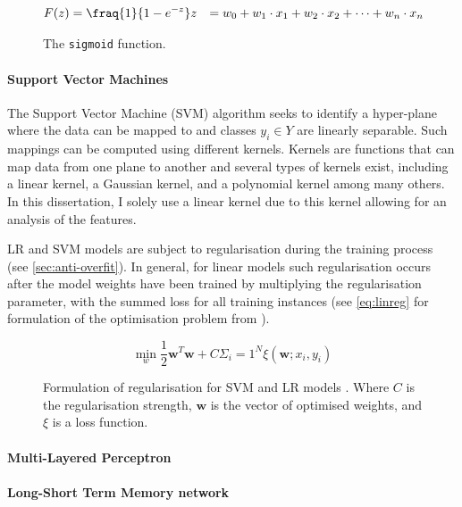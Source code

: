 \begin{figure}[h]
  \begin{align}\label{eq:sigmoid}
    F(z) &= \fraq{1}{1-e^{-z}}
    z &= w_0 + w_1 \cdot x_1 + w_2 \cdot x_2 + \cdots + w_n \cdot x_n
  \end{align}
  \caption{The \texttt{sigmoid} function.}
\end{figure}

\paragraph{Support Vector Machines}
The Support Vector Machine (SVM) algorithm seeks to identify a hyper-plane where the data can be mapped to and classes $y_i \in Y$ are linearly separable. Such mappings can be computed using different kernels.
Kernels are functions that can map data from one plane to another and several types of kernels exist, including a linear kernel, a Gaussian kernel, and a polynomial kernel among many others.
In this dissertation, I solely use a linear kernel due to this kernel allowing for an analysis of the features.


LR and SVM models are subject to regularisation during the training process (see \cref{sec:anti-overfit}). In general, for linear models such regularisation occurs after the model weights have been trained by multiplying the regularisation parameter, with the summed loss for all training instances \citep{Fan:2008} (see \cref{eq:linreg} for formulation of the optimisation problem from \citet{Fan:2008}).

\begin{figure}[h]
  \begin{equation}\label{eq:linreg}
    \min_w\frac{1}{2}\mathbf{w}^T\mathbf{w} + C\Sigma_i=1^N\xi(\mathbf{w};x_i,y_i)
  \end{equation}
  \caption[Formulation of regularsation for SVM and LR models]{Formulation of regularisation for SVM and LR models \citep{Fan:2008}. Where $C$ is the regularisation strength, $\mathbf{w}$ is the vector of optimised weights, and $\xi$ is a loss function.}
\end{figure}

\paragraph{Multi-Layered Perceptron}


\paragraph{Long-Short Term Memory network}

